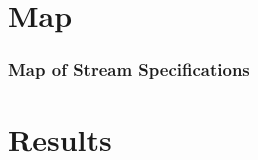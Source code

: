 \documentclass[10pt]{beamer}
\begin{document}
\section{Map}


\begin{frame}%
  \frametitle{Map of Stream Specifications}  
    
\begin{center}
\end{center}

\end{frame}%

\section{Results}
\end{document}
